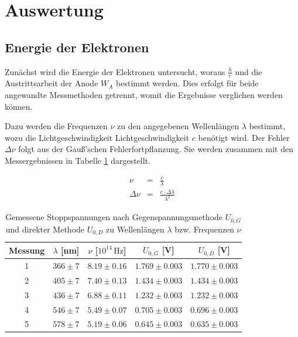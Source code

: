 \documentclass[12pt,a4paper]{scrartcl}
\numberwithin{equation}{section} %
\begin{document}
\clearpage
\hypertarget{auswertung}{\section{Auswertung}\label{auswertung}}
\subsection{Energie der Elektronen}
\label{auswertung:h/e}

Zunächst wird die Energie der Elektronen untersucht, woraus $\frac{h}{e}$ und die Austrittsarbeit der Anode $W_A$ bestimmt werden. Dies erfolgt für beide angewandte Messmethoden getrennt, womit die Ergebnisse verglichen werden können.

Dazu werden die Frequenzen $\nu$ zu den angegebenen Wellenlängen $\lambda$ bestimmt, wozu die Lichtgeschwindigkeit Lichtgeschwindigkeit $c$ benötigt wird. Der Fehler $\Delta \nu$ folgt aus der Gauß'schen Fehlerfortpflanzung. Sie werden zusammen mit den Messergebnissen in Tabelle \ref{table:Messwerte Energie} dargestellt.

\begin{eqnarray}
	\nu &=& \frac{c}{\lambda} \label{eq:frequenzWellenlänge} \\
	\Delta \nu &=& \frac{c \cdot \Delta \lambda}{\lambda^2}
\end{eqnarray}

\begin{table}[h!]
	\centering
	\begin{tabular}{c|c|c|c|c}
		Messung & $\lambda$ [nm] & $\nu$ [$10^{14} \mathrm{\, Hz}$] & $U_{0,G}$ [V] & $U_{0,D}$ [V] \\
		\hline
		1 & $366 \pm 7$ & $8.19 \pm 0.16$ & $1.769 \pm 0.003$ & $1.770 \pm 0.003$ \\
		2 & $405 \pm 7$ & $7.40 \pm 0.13$ & $1.434 \pm 0.003$ & $1.434 \pm 0.003$ \\
		3 & $436 \pm 7$ & $6.88 \pm 0.11$ & $1.232 \pm 0.003$ & $1.232 \pm 0.003$ \\
		4 & $546 \pm 7$ & $5.49 \pm 0.07$ & $0.705 \pm 0.003$ & $0.696 \pm 0.003$ \\
		5 & $578 \pm 7$ & $5.19 \pm 0.06$ & $0.645 \pm 0.003$ & $0.635 \pm 0.003$
	\end{tabular}
	\caption{Gemessene Stoppspannungen nach Gegenspannungsmethode $U_{0,G}$ und direkter Methode $U_{0,D}$ zu Wellenlängen $\lambda$ bzw. Frequenzen $\nu$}
	\label{table:Messwerte Energie}
\end{table}
\end{document}
